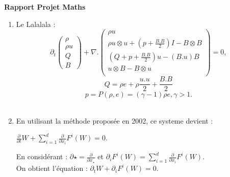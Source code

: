 \documentclass{report}
\begin{document}
  \begin{center}
  \textbf{\huge{Rapport Projet Maths}}
  \end{center}
  \begin{enumerate}
  \item
    Le Lalalala :
  \begin{equation}
    \partial_t
    \left( \begin{array}{c}
    \rho \\
    \rho u \\
    Q \\
    B
    \end{array}
  \right)
  + \nabla .
  \left( \begin{array}{c}
    \rho u \\
    \rho u \otimes u + (p + \frac{B.B}{2})I - B \otimes B \\
    (Q + p + \frac{B.B}{2})u - (B.u)B \\
    u \otimes B - B \otimes u \\
    \end{array}
  \right)
  = 0,
  \end{equation}
  \begin{equation}
    Q = \rho e + \rho \frac{u.u}{2} + \frac{B.B}{2}
  \end{equation}
  \begin{equation}
    p = P(\rho,e) = (\gamma - 1)\rho e, \gamma > 1.
  \end{equation} \\


  \item
   En utilisant la m\'ethode propos\'ee en 2002, ce systeme devient : \\
  \begin{center}
    \begin{math}
      \frac{\partial}{\partial t}W + \sum\limits_{i=1}^d \frac{\partial}{\partial x_i}F^i(W) = 0.
    \end{math}
  \end{center}

  En consid\'erant :
  \begin{math}
    \partial\star = \frac{\partial}{\partial x_\star}
  \end{math}
   et
   \begin{math}
     \partial_iF^i(W) = \sum\limits_{i=1}^d\frac{\partial}{\partial x_i}F^i(W).
   \end{math} \\
   On obtient l'\'equation :
   \begin{math}
     \partial_tW+\partial_iF^i(W) = 0.
   \end{math}
 \end{enumerate}
\end{document}
